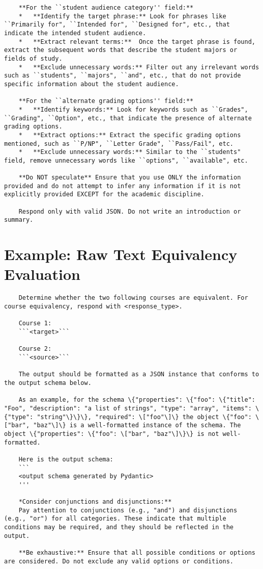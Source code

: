 \begin{lstlisting}
    **For the ``student audience category'' field:**
    *   **Identify the target phrase:** Look for phrases like ``Primarily for", ``Intended for", ``Designed for", etc., that indicate the intended student audience.
    *   **Extract relevant terms:**  Once the target phrase is found, extract the subsequent words that describe the student majors or fields of study.
    *   **Exclude unnecessary words:** Filter out any irrelevant words such as ``students", ``majors", ``and", etc., that do not provide specific information about the student audience.
    
    **For the ``alternate grading options'' field:**
    *   **Identify keywords:** Look for keywords such as ``Grades", ``Grading", ``Option", etc., that indicate the presence of alternate grading options.
    *   **Extract options:** Extract the specific grading options mentioned, such as ``P/NP", ``Letter Grade", ``Pass/Fail", etc.
    *   **Exclude unnecessary words:** Similar to the ``students" field, remove unnecessary words like ``options", ``available", etc.
    
    **Do NOT speculate** Ensure that you use ONLY the information provided and do not attempt to infer any information if it is not explicitly provided EXCEPT for the academic discipline.

    Respond only with valid JSON. Do not write an introduction or summary.
\end{lstlisting}

\section{Example: Raw Text Equivalency Evaluation}\label{app:rawequivprompt}

\begin{lstlisting}
    Determine whether the two following courses are equivalent. For course equivalency, respond with <response_type>.

    Course 1:
    ```<target>```

    Course 2:
    ```<source>```

    The output should be formatted as a JSON instance that conforms to the output schema below.

    As an example, for the schema \{"properties": \{"foo": \{"title": "Foo", "description": "a list of strings", "type": "array", "items": \{"type": "string"\}\}\}, "required": \["foo"\]\} the object \{"foo": \["bar", "baz"\]\} is a well-formatted instance of the schema. The object \{"properties": \{"foo": \["bar", "baz"\]\}\} is not well-formatted.

    Here is the output schema:
    ```
    <output schema generated by Pydantic>
    '''

    *Consider conjunctions and disjunctions:**
    Pay attention to conjunctions (e.g., "and") and disjunctions (e.g., "or") for all categories. These indicate that multiple conditions may be required, and they should be reflected in the output.

    **Be exhaustive:** Ensure that all possible conditions or options are considered. Do not exclude any valid options or conditions.
\end{lstlisting}

